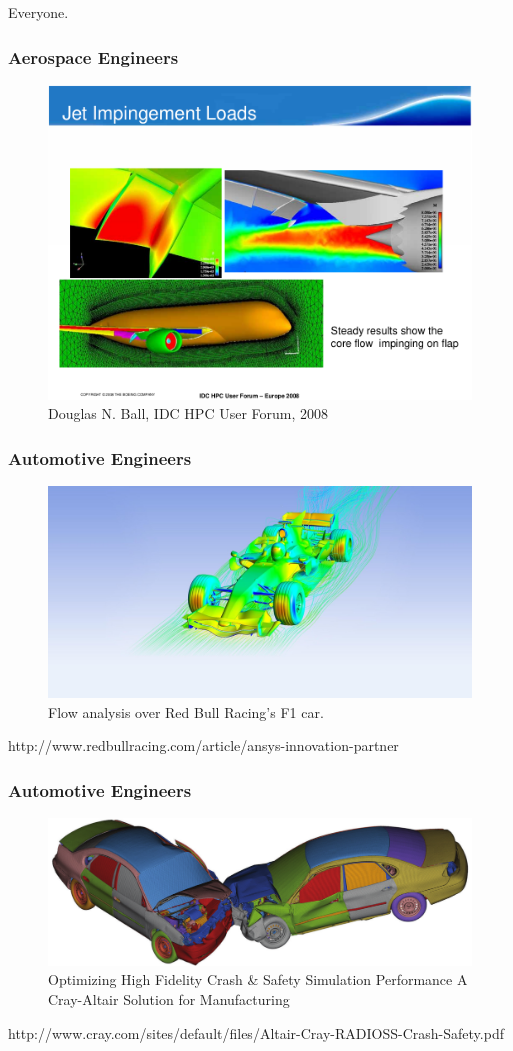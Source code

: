 \documentclass{beamer}
\begin{document}
\begin{frame}
  \center Everyone.
\end{frame}

\begin{frame}
  \frametitle{Aerospace Engineers}
  \begin{figure} \centering
    \includegraphics[width=.8\textwidth]{figs/cfd/boeing-jet-load.png}
    \caption{Douglas N. Ball, IDC HPC User Forum, 2008}
  \end{figure}
\end{frame}

\begin{frame}
  \frametitle{Automotive Engineers}
  \begin{figure} \centering
    \includegraphics[width=.8\textwidth]{figs/cfd/redbull-ansys.jpg}
    \caption{Flow analysis over Red Bull Racing's F1 car.}
  \end{figure}
  {\small http://www.redbullracing.com/article/ansys-innovation-partner}
\end{frame}

\begin{frame}
  \frametitle{Automotive Engineers}
  \begin{figure} \centering
    \includegraphics[width=.8\textwidth]{figs/cfd/altair-cray-crash-test.png}
    \caption{Optimizing High Fidelity Crash \& Safety Simulation Performance
  A Cray-Altair Solution for Manufacturing}
  \end{figure}
  {\small
    http://www.cray.com/sites/default/files/Altair-Cray-RADIOSS-Crash-Safety.pdf
  }
\end{frame}
\end{document}
